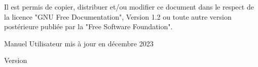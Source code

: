 {\begin{titlepage}
\begin{flushleft}
    Il est permis de copier, distribuer et/ou modifier ce document dans le respect de la licence "GNU Free Documentation", Version 1.2 ou toute autre version postérieure publiée par la "Free Software Foundation".

    Manuel Utilisateur mis à jour en décembre 2023
    \end{flushleft}
    \end{titlepage}
    \pagestyle{headings}
}{%
    \begin{titlepage}
        \large{Version \DocVersion}
    \end{titlepage}
    \clearemptydoublepage \pagestyle{headings}
    \clearemptydoublepage {}
}
\makeatother
